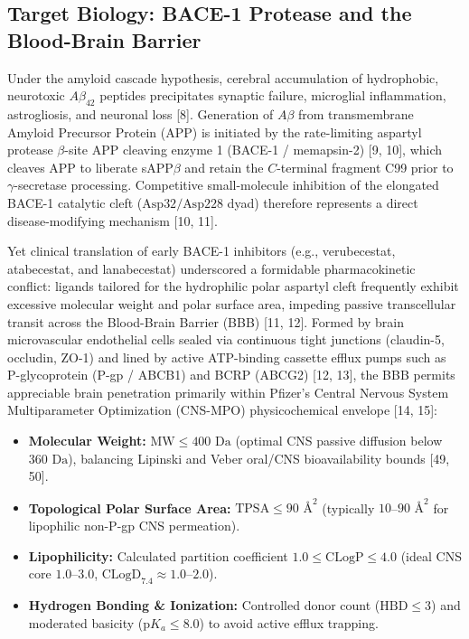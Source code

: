 \documentclass[10pt,a4paper]{article}
\begin{document}
\subsection{Target Biology: BACE-1 Protease and the Blood-Brain Barrier}
Under the amyloid cascade hypothesis, cerebral accumulation of hydrophobic, neurotoxic $A\beta_{42}$ peptides precipitates synaptic failure, microglial inflammation, astrogliosis, and neuronal loss [8]. Generation of $A\beta$ from transmembrane Amyloid Precursor Protein (APP) is initiated by the rate-limiting aspartyl protease $\beta$-site APP cleaving enzyme 1 (BACE-1 / memapsin-2) [9, 10], which cleaves APP to liberate sAPP$\beta$ and retain the $C$-terminal fragment C99 prior to $\gamma$-secretase processing. Competitive small-molecule inhibition of the elongated BACE-1 catalytic cleft ($\text{Asp}32/\text{Asp}228$ dyad) therefore represents a direct disease-modifying mechanism [10, 11].

Yet clinical translation of early BACE-1 inhibitors (e.g., verubecestat, atabecestat, and lanabecestat) underscored a formidable pharmacokinetic conflict: ligands tailored for the hydrophilic polar aspartyl cleft frequently exhibit excessive molecular weight and polar surface area, impeding passive transcellular transit across the Blood-Brain Barrier (BBB) [11, 12]. Formed by brain microvascular endothelial cells sealed via continuous tight junctions (claudin-5, occludin, ZO-1) and lined by active ATP-binding cassette efflux pumps such as P-glycoprotein (P-gp / ABCB1) and BCRP (ABCG2) [12, 13], the BBB permits appreciable brain penetration primarily within Pfizer's Central Nervous System Multiparameter Optimization (CNS-MPO) physicochemical envelope [14, 15]:
\begin{itemize}[noitemsep]
    \item \textbf{Molecular Weight:} $\mathrm{MW} \le 400\text{ Da}$ (optimal CNS passive diffusion below $360\text{ Da}$), balancing Lipinski and Veber oral/CNS bioavailability bounds [49, 50].
    \item \textbf{Topological Polar Surface Area:} $\mathrm{TPSA} \le 90\text{ \AA}^2$ (typically $10$--$90\text{ \AA}^2$ for lipophilic non-P-gp CNS permeation).
    \item \textbf{Lipophilicity:} Calculated partition coefficient $1.0 \le \text{CLogP} \le 4.0$ (ideal CNS core $1.0$--$3.0$, $\text{CLogD}_{7.4} \approx 1.0$--$2.0$).
    \item \textbf{Hydrogen Bonding \& Ionization:} Controlled donor count ($\mathrm{HBD} \le 3$) and moderated basicity ($\mathrm{p}K_a \le 8.0$) to avoid active efflux trapping.
\end{itemize}
\end{document}
